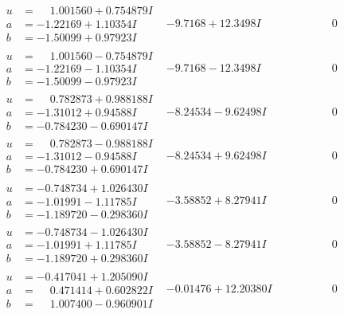 \documentclass[1p]{elsarticle_modified}
\theoremstyle{definition}
\begin{document}
$$\begin{array}{c|c|c}
 \hline 
\begin{aligned}
u &= \phantom{-}1.001560 + 0.754879 I \\
a &= -1.22169 + 1.10354 I \\
b &= -1.50099 + 0.97923 I\end{aligned}
 & -9.7168 + 12.3498 I & \phantom{-0.000000 } 0 \\ \hline\begin{aligned}
u &= \phantom{-}1.001560 - 0.754879 I \\
a &= -1.22169 - 1.10354 I \\
b &= -1.50099 - 0.97923 I\end{aligned}
 & -9.7168 - 12.3498 I & \phantom{-0.000000 } 0 \\ \hline\begin{aligned}
u &= \phantom{-}0.782873 + 0.988188 I \\
a &= -1.31012 + 0.94588 I \\
b &= -0.784230 - 0.690147 I\end{aligned}
 & -8.24534 - 9.62498 I & \phantom{-0.000000 } 0 \\ \hline\begin{aligned}
u &= \phantom{-}0.782873 - 0.988188 I \\
a &= -1.31012 - 0.94588 I \\
b &= -0.784230 + 0.690147 I\end{aligned}
 & -8.24534 + 9.62498 I & \phantom{-0.000000 } 0 \\ \hline\begin{aligned}
u &= -0.748734 + 1.026430 I \\
a &= -1.01991 - 1.11785 I \\
b &= -1.189720 - 0.298360 I\end{aligned}
 & -3.58852 + 8.27941 I & \phantom{-0.000000 } 0 \\ \hline\begin{aligned}
u &= -0.748734 - 1.026430 I \\
a &= -1.01991 + 1.11785 I \\
b &= -1.189720 + 0.298360 I\end{aligned}
 & -3.58852 - 8.27941 I & \phantom{-0.000000 } 0 \\ \hline\begin{aligned}
u &= -0.417041 + 1.205090 I \\
a &= \phantom{-}0.471414 + 0.602822 I \\
b &= \phantom{-}1.007400 - 0.960901 I\end{aligned}
 & -0.01476 + 12.20380 I & \phantom{-0.000000 } 0 \\ \hline\begin{aligned}

\end{aligned}
\end{array}$$
\end{document}
